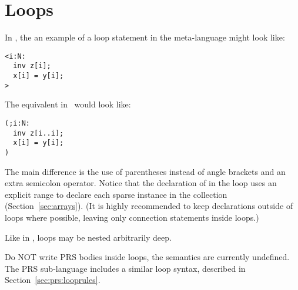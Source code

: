 
\section{Loops}
\label{sec:loops}

In \CAST, the an example of a loop statement in the meta-language
might look like:

\begin{verbatim}
<i:N:
  inv z[i];
  x[i] = y[i];
>
\end{verbatim}

The equivalent in \hac\ would look like:

\begin{verbatim}
(;i:N:
  inv z[i..i];
  x[i] = y[i];
)
\end{verbatim}

The main difference is the use of parentheses instead of 
angle brackets and an extra semicolon operator.  
Notice that the declaration of  in the loop uses
an explicit range to declare each sparse instance 
in the collection (Section~\ref{sec:arrays}).  
(It is highly recommended to keep declarations outside of 
loops where possible, leaving only connection statements inside loops.)

Like in \CAST, loops may be nested arbitrarily deep.  

Do NOT write PRS bodies inside loops, the semantics are currently
undefined.  The PRS sub-language includes a similar loop syntax, 
described in Section~\ref{sec:prs:looprules}.  

